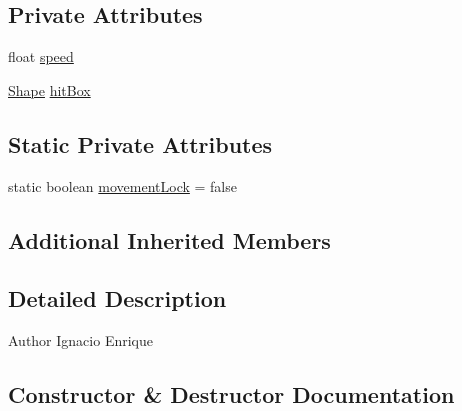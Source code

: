 \subsection*{Private Attributes}
\begin{DoxyCompactItemize}
\item 
float \mbox{\hyperlink{classentities_1_1_mobile_entity_a815a9d2b23a0bb7e3ee7739d4c10d7c3}{speed}}
\item 
\mbox{\hyperlink{classorg_1_1newdawn_1_1slick_1_1geom_1_1_shape}{Shape}} \mbox{\hyperlink{classentities_1_1_mobile_entity_a996d583dcbf4fd5609e14ec87dbfa7a6}{hit\+Box}}
\end{DoxyCompactItemize}
\subsection*{Static Private Attributes}
\begin{DoxyCompactItemize}
\item 
static boolean \mbox{\hyperlink{classentities_1_1_mobile_entity_a11e74ffe949d0d32ab26bcf36fa2bb1d}{movement\+Lock}} = false
\end{DoxyCompactItemize}
\subsection*{Additional Inherited Members}


\subsection{Detailed Description}
\begin{DoxyAuthor}{Author}
Ignacio Enrique 
\end{DoxyAuthor}


\subsection{Constructor \& Destructor Documentation}
\mbox{\label{classentities_1_1_mobile_entity_a41aad516f10a2ca7b8ac68dabed30312}} 
